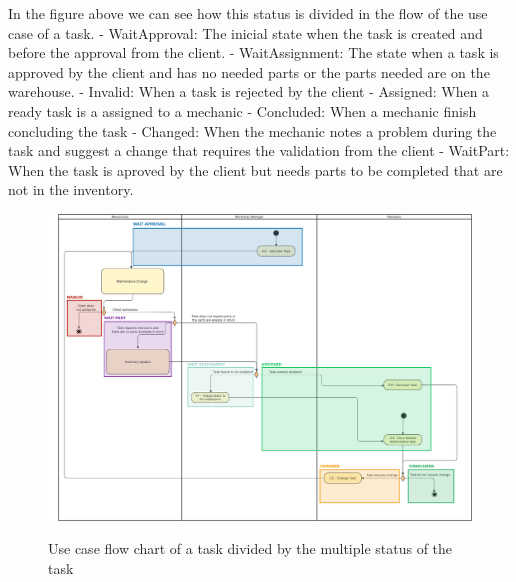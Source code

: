 In the figure above we can see how this status is divided in the flow of the use case of a task.
- WaitApproval: The inicial state when the task is created and before the approval from the client.
- WaitAssignment: The state when a task is approved by the client and has no needed parts or the parts needed are on the warehouse. 
- Invalid: When a task is rejected by the client
- Assigned: When a ready task is a assigned to a mechanic
- Concluded: When a mechanic finish concluding the task
- Changed: When the mechanic notes a problem during the task and suggest a change that requires the validation from the client
- WaitPart: When the task is aproved by the client but needs parts to be completed that are not in the inventory.



\begin{figure}[h]
  \caption{Use case flow chart of a task divided by the multiple status of the task}
  \centering
  \includegraphics[width=\textwidth]{figs/Status/MaintenanceTask/UseCaseStatus}
  \label{fig:figure2}
\end{figure}

